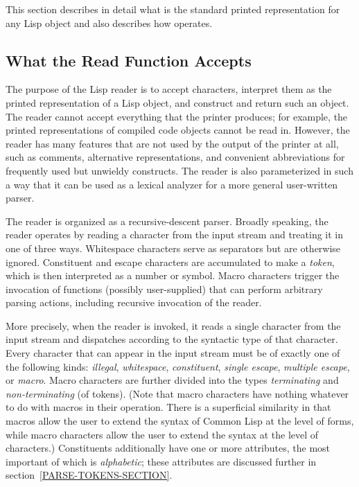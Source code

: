 This section describes in detail what is the standard printed
representation for any Lisp object and also describes how  operates.

\subsection{What the Read Function Accepts}
\label{READER}
The purpose of the Lisp reader is to accept characters, interpret them
as the printed representation of a Lisp object, and construct and
return such an object.  The reader cannot accept everything that the
printer produces; for example, the printed representations of compiled
code objects cannot be read in.  However, the reader has
many features that are not used by the output of the printer at all,
such as comments, alternative representations, and convenient
abbreviations for frequently used but unwieldy constructs.  The reader is
also parameterized in such a way that it can be used as a lexical
analyzer for a more general user-written parser.

The reader is organized as a recursive-descent parser.
Broadly speaking,
the reader operates by reading a character from
the input stream and treating it in one of three ways.
Whitespace characters serve as separators but are otherwise
ignored.  Constituent and escape characters are accumulated
to make a \emph{token}, which is then interpreted as a number or symbol.
Macro characters trigger the invocation of functions (possibly
user-supplied) that can perform arbitrary parsing actions,
including recursive invocation of the reader.

More precisely,
when the reader is invoked, it reads a single character from the input stream
and dispatches according to the syntactic type of that character.
Every character that can appear in the input stream
must be of exactly one of the following kinds:
\emph{illegal},
\emph{whitespace},
\emph{constituent},
\emph{single escape},
\emph{multiple escape}, or
\emph{macro}.
Macro characters are further divided
into the types \emph{terminating} and \emph{non-terminating} (of tokens).
(Note that macro characters have nothing whatever to do with macros
in their operation.  There is a superficial similarity in that macros allow
the user to extend the syntax of Common Lisp at the level of forms,
while macro characters allow the user to extend the syntax at the
level of characters.)
Constituents additionally have one or more attributes,
the most important of which is \emph{alphabetic}; these attributes are discussed
further in section~\ref{PARSE-TOKENS-SECTION}.

